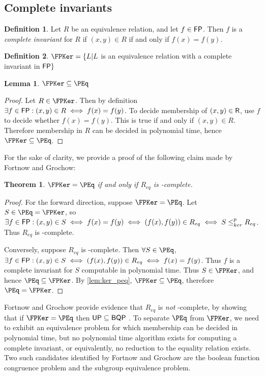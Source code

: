 \documentclass{amsart}
\newtheorem{theorem}{Theorem}[section]
\newtheorem{lemma}[lemma]{Lemma}
\theoremstyle{definition} \newtheorem{definition}[definition]{Definition}
\newcommand{\kr}{\leq^{p}_{ker}} %
\newcommand{\defn}[1]{\emph{#1}} %
\begin{document}
\subsection{Complete invariants}
\begin{definition}
  Let $R$ be an equivalence relation, and let $f\in{\ensuremath{\mathsf{FP}}}$. Then $f$ is a
  \defn{complete invariant} for $R$ if $(x,y)\in R$ if and only if $f(x)=f(y)$.
\end{definition}
\begin{definition}
  $\FPKer=\{L|L$ is an equivalence relation with a complete invariant in
  ${\mathsf{FP}}\}$
\end{definition}

\begin{lemma}\label{lem:ker_peq}
  $\FPKer\subseteq\PEq$
\end{lemma}
\begin{proof}
  Let $R\in\FPKer$. Then by definition $\exists f\in{\ensuremath{\mathsf{FP}}}: (x,y)\in R\iff
  f(x)=f(y)$. To decide membership of $(x,y)\in{\ensuremath{\mathsf{R}}}$, use $f$ to decide whether
  $f(x)=f(y)$. This is true if and only if $(x,y)\in R$. Therefore membership
  in $R$ can be decided in polynomial time, hence $\FPKer\subseteq\PEq$.
\end{proof}

For the sake of clarity, we provide a proof of the following claim made by
Fortnow and Grochow:

\begin{theorem}
  $\FPKer=\PEq$ if and only if $R_{eq}$ is \PEq-complete.
\end{theorem}
\begin{proof}
  For the forward direction, suppose $\FPKer=\PEq$. Let $S\in\PEq=\FPKer$, so
  $\exists f\in\FP: (x,y)\in S\iff f(x)=f(y)\iff (f(x),f(y))\in R_{eq}\iff S\kr
  R_{eq}$. Thus $R_{eq}$ is \PEq-complete.

  Conversely, suppose $R_{eq}$ is \PEq-complete. Then $\forall S\in\PEq$,
  $\exists f\in{\ensuremath{\mathsf{FP}}}:(x,y)\in S\iff(f(x),f(y))\in R_{eq}\iff f(x)=f(y)$. Thus $f$
  is a complete invariant for $S$ computable in polynomial time. Thus
  $S\in\FPKer$, and hence $\PEq\subseteq\FPKer$. By \autoref{lem:ker_peq},
  $\FPKer\subseteq\PEq$, therefore $\PEq=\FPKer$.
\end{proof}

Fortnow and Grochow provide evidence that $R_{eq}$ is \emph{not} \PEq-complete,
by showing that if $\FPKer=\PEq$ then ${\mathsf{UP}}\subseteq{\ensuremath{\mathsf{BQP}}}$ \cite{fg09}. To
separate $\PEq$ from $\FPKer$, we need to exhibit an equivalence problem for
which membership can be decided in polynomial time, but no polynomial time
algorithm exists for computing a complete invariant, or equivalently, no
reduction to the equality relation exists. Two such candidates identified by
Fortnow and Grochow are the boolean function congruence problem and the
subgroup equivalence problem.
\end{document}
